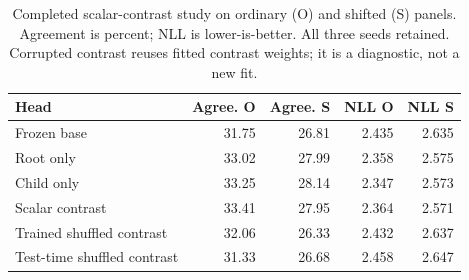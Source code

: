 \begin{table}[ht]
\centering\small
\caption{Completed scalar-contrast study on ordinary (O) and shifted (S) panels. Agreement is percent; NLL is lower-is-better. All three seeds retained. Corrupted contrast reuses fitted contrast weights; it is a diagnostic, not a new fit.\label{tab:graph-contrast}}
\begin{tabular}{lrrrr}
\toprule
Head & Agree. O & Agree. S & NLL O & NLL S \\
\midrule
Frozen base & 31.75 & 26.81 & 2.435 & 2.635 \\
Root only & 33.02 & 27.99 & 2.358 & 2.575 \\
Child only & 33.25 & 28.14 & 2.347 & 2.573 \\
Scalar contrast & 33.41 & 27.95 & 2.364 & 2.571 \\
Trained shuffled contrast & 32.06 & 26.33 & 2.432 & 2.637 \\
Test-time shuffled contrast & 31.33 & 26.68 & 2.458 & 2.647 \\
\bottomrule
\end{tabular}
\end{table}
